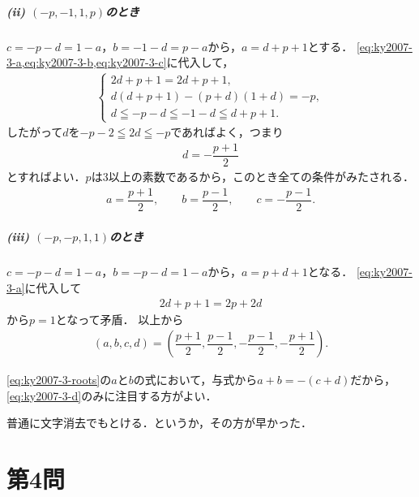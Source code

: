 \documentclass[../main.tex]{subfiles}
\begin{document}
\subparagraph{(ii) $(-p,-1,1,p)$のとき}
$c=-p-d=1-a$，$b=-1-d=p-a$から，$a=d+p+1$とする．
\cref{eq:ky2007-3-a,eq:ky2007-3-b,eq:ky2007-3-c}に代入して，
\begin{align}
  \begin{cases}
    2d+p+1=2d+p+1,\\
    d(d+p+1)-(p+d)(1+d)=-p,\\
    d\leqq-p-d\leqq-1-d\leqq d+p+1.
  \end{cases}
\end{align}
したがって$d$を$-p-2\leqq2d\leqq-p$であればよく，つまり
\begin{align}d=-\dfrac{p+1}{2}
\end{align}
とすればよい．$p$は3以上の素数であるから，このとき全ての条件がみたされる．
\begin{align}
  a=\dfrac{p+1}{2},\qquad b=\dfrac{p-1}{2},\qquad c=-\dfrac{p-1}{2}.
\end{align}

\subparagraph{(iii) $(-p,-p,1,1)$のとき}
$c=-p-d=1-a$，$b=-p-d=1-a$から，$a=p+d+1$となる．
\cref{eq:ky2007-3-a}に代入して
\begin{align}2d+p+1=2p+2d
\end{align}
から$p=1$となって矛盾．
\casesend
以上から
\begin{align}
  (a,b,c,d)=\left(\dfrac{p+1}{2},\dfrac{p-1}{2},-\dfrac{p-1}{2},-\dfrac{p+1}{2}\right).
\end{align}

\medskip\noindent{\bf [補足]}
\cref{eq:ky2007-3-roots}の$a$と$b$の式において，与式から$a+b=-(c+d)$だから，
\cref{eq:ky2007-3-d}のみに注目する方がよい．

\medskip\noindent{\bf [別解についての原稿メモ]}
普通に文字消去でもとける．というか，その方が早かった．
\newpage

\section*{第4問}
\end{document}
